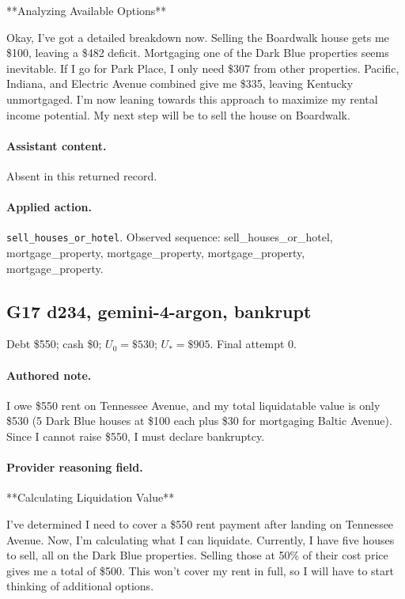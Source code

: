 **Analyzing Available Options**

Okay, I've got a detailed breakdown now. Selling the Boardwalk house gets me \$100, leaving a \$482 deficit.  Mortgaging one of the Dark Blue properties seems inevitable. If I go for Park Place, I only need \$307 from other properties. Pacific, Indiana, and Electric Avenue combined give me \$335, leaving Kentucky unmortgaged. I'm now leaning towards this approach to maximize my rental income potential. My next step will be to sell the house on Boardwalk.




\paragraph{Assistant content.} Absent in this returned record.

\paragraph{Applied action.} \texttt{sell\_houses\_or\_hotel}. Observed sequence: sell\_houses\_or\_hotel, mortgage\_property, mortgage\_property, mortgage\_property, mortgage\_property.

\subsection*{G17 d234, gemini-4-argon, bankrupt}

\noindent Debt \$550; cash \$0; $U_0=\$530$; $U_*=\$905$. Final attempt 0.\par

\paragraph{Authored note.} I owe \$550 rent on Tennessee Avenue, and my total liquidatable value is only \$530 (5 Dark Blue houses at \$100 each plus \$30 for mortgaging Baltic Avenue). Since I cannot raise \$550, I must declare bankruptcy.

\paragraph{Provider reasoning field.} **Calculating Liquidation Value**

I've determined I need to cover a \$550 rent payment after landing on Tennessee Avenue. Now, I'm calculating what I can liquidate. Currently, I have five houses to sell, all on the Dark Blue properties. Selling those at 50\% of their cost price gives me a total of \$500. This won't cover my rent in full, so I will have to start thinking of additional options.




